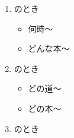     \begin{enumerate}
        \item {}のとき
        \par\vspace{0.5em}
        \noindent
        \begin{minipage}[t]{0.48\linewidth}
            \begin{itemize}
                \item 何時〜
            \end{itemize}
        \end{minipage}\hfill
        \begin{minipage}[t]{0.48\linewidth}
            \begin{itemize}
                \item どんな本〜
            \end{itemize}
        \end{minipage}
        \par\vspace{2em}
        \item {}のとき
        \par\vspace{0.5em}
        \noindent
        \begin{minipage}[t]{0.48\linewidth}
            \begin{itemize}
                \item どの道〜
            \end{itemize}
        \end{minipage}\hfill
        \begin{minipage}[t]{0.48\linewidth}
            \begin{itemize}
                \item どの本〜
            \end{itemize}
        \end{minipage}
        \par\vspace{2em}
        \item {}のとき
        \par\vspace{0.5em}
        \noindent
        \begin{minipage}[t]{0.48\linewidth}

\end{minipage}
\end{enumerate}
